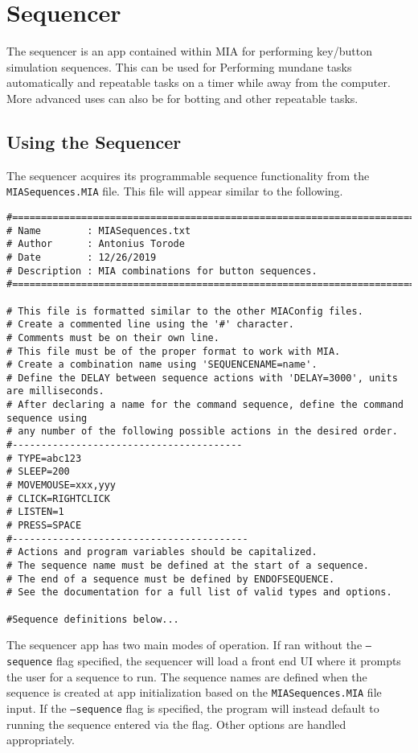 \chapter{Sequencer} \label{sequencer}
\pagestyle{fancy}

The sequencer is an app contained within MIA for performing key/button simulation sequences. This can be used for Performing mundane tasks automatically and repeatable tasks on a timer while away from the computer. More advanced uses can also be for botting and other repeatable tasks.

\section{Using the Sequencer}

The sequencer acquires its programmable sequence functionality from the \texttt{MIASequences.MIA} file. This file will appear similar to the following.

\begin{lstlisting}[style=pythonstyle]
#============================================================================
# Name        : MIASequences.txt
# Author      : Antonius Torode
# Date        : 12/26/2019
# Description : MIA combinations for button sequences.
#============================================================================

# This file is formatted similar to the other MIAConfig files.
# Create a commented line using the '#' character. 
# Comments must be on their own line.
# This file must be of the proper format to work with MIA.
# Create a combination name using 'SEQUENCENAME=name'.
# Define the DELAY between sequence actions with 'DELAY=3000', units are milliseconds.
# After declaring a name for the command sequence, define the command sequence using 
# any number of the following possible actions in the desired order.
#----------------------------------------
# TYPE=abc123
# SLEEP=200
# MOVEMOUSE=xxx,yyy
# CLICK=RIGHTCLICK
# LISTEN=1
# PRESS=SPACE
#-----------------------------------------
# Actions and program variables should be capitalized.
# The sequence name must be defined at the start of a sequence.
# The end of a sequence must be defined by ENDOFSEQUENCE.
# See the documentation for a full list of valid types and options.

#Sequence definitions below...
\end{lstlisting}

The sequencer app has two main modes of operation. If ran without the \texttt{--sequence} flag specified, the sequencer will load a front end UI where it prompts the user for a sequence to run. The sequence names are defined when the sequence is created at app initialization based on the \texttt{MIASequences.MIA} file input. If the \texttt{--sequence} flag is specified, the program will instead default to running the sequence entered via the flag. Other options are handled appropriately.

